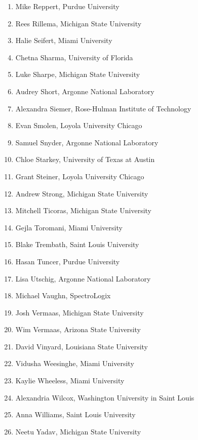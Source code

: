 \begin{multicols}{2}
\begin{enumerate}
\item Mike	Reppert,	Purdue University
\item Rees	Rillema,	Michigan State University 
\item Halie	Seifert,	Miami University
\item Chetna 	Sharma,	University of Florida
\item Luke	Sharpe,	Michigan State University
\item Audrey	Short,	Argonne National Laboratory
\item Alexandra	Siemer,	Rose-Hulman Institute of Technology
\item Evan	Smolen,	Loyola University Chicago
\item Samuel	Snyder,	Argonne National Laboratory
\item Chloe	Starkey,	University of Texas at Austin
\item Grant	Steiner,	Loyola University Chicago
\item Andrew	Strong,	Michigan State University
\item Mitchell	Ticoras,	Michigan State University
\item Gejla	Toromani,	Miami University
\item Blake	Trembath,	Saint Louis University
\item Hasan	Tuncer,	Purdue University
\item Lisa	Utschig,	Argonne National Laboratory
\item Michael	Vaughn,	SpectroLogix
\item Josh	Vermaas,	Michigan State University
\item Wim	Vermaas,	Arizona State University
\item David	Vinyard,	Louisiana State University
\item Vidusha	Weesinghe,	Miami University
\item Kaylie 	Wheeless,	Miami University
\item Alexandria	Wilcox,	Washington University in Saint Louis
\item Anna	Williams,	Saint Louis University 
\item Neetu	Yadav,	Michigan State University
	\end{enumerate}
\end{multicols}